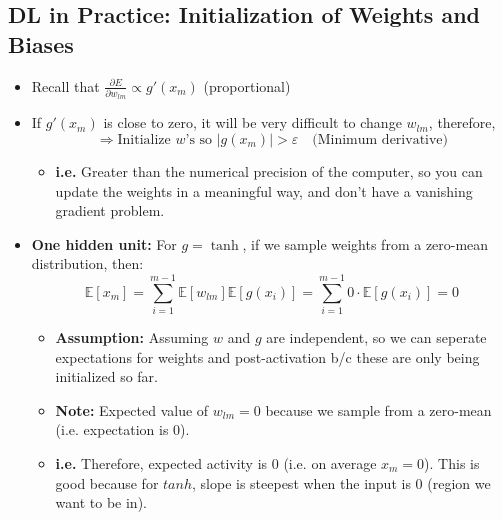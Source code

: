 \subsection{DL in Practice: Initialization of Weights and Biases} 
\begin{summary}
    \begin{itemize}
        \item Recall that \( \frac{\partial E}{\partial w_{lm}} \propto g'(x_m) \) (proportional)
        
        \item If \( g'(x_m) \) is close to zero, it will be very difficult to change \( w_{lm} \), therefore,
        \[
        \Rightarrow \text{Initialize } w\text{'s so } |g(x_m)| > \varepsilon \quad \text{(Minimum derivative)}
        \]
        \begin{itemize}
            \item \textbf{i.e.} Greater than the numerical precision of the computer, so you can update the weights in a meaningful way, and don't have a vanishing gradient problem. 
        \end{itemize}
    
        \item \textbf{One hidden unit:} For \( g = \tanh \), if we sample weights from a zero-mean distribution, then:
        \[
        \mathbb{E}[x_m] = \sum_{i=1}^{m-1} \mathbb{E}[w_{lm}] \mathbb{E}[g(x_i)] = \sum_{i=1}^{m-1} 0 \cdot \mathbb{E}[g(x_i)] = 0
        \]
        \begin{itemize}
            \item \textbf{Assumption:} Assuming $w$ and $g$ are independent, so we can seperate expectations for weights and post-activation b/c these are only being initialized so far.
            \item \textbf{Note:} Expected value of $w_{lm} = 0$ because we sample from a zero-mean (i.e. expectation is 0).
            \item \textbf{i.e.} Therefore, expected activity is 0 (i.e. on average $x_m =0$). This is good because for $tanh$, slope is steepest when the input is $0$ (region we want to be in).
        \end{itemize}
        

\end{itemize}
\end{summary}
